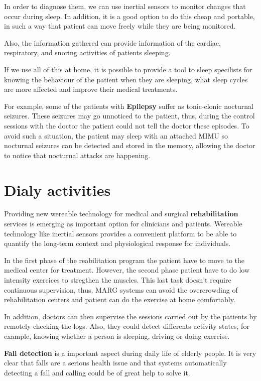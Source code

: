 In order to diagnose them, we can use inertial sensors to monitor changes that occur during sleep. In addition, it is a good option to do this  cheap and portable, in such a way that patient can move freely while they are being monitored\cite{A.Olivares2013}.

Also, the information gathered can provide information  of the cardiac, respiratory, and snoring activities of patients sleeping\cite{SanchezDaniel}.

If we use all of this at home, it is possible to provide a tool to sleep specilists for knowing the behaviour of the patient when they are sleeping, what sleep cycles are more affected and improve their medical  treatments. 

For example,  some of the patients with \textbf{Epilepsy} suffer as tonic-clonic nocturnal seizures. These seizures  may go unnoticed to the patient, thus, during the control sessions with the doctor the patient could not tell the doctor these episodes. To avoid such a situation, the patient may sleep with an attached MIMU so nocturnal seizures can be detected and stored in the memory, allowing the doctor to notice that nocturnal attacks are happening\cite{A.Olivares2013}. 

\section{Dialy activities }
Providing new wereable technology for medical and surgical \textbf{rehabilitation} services is emerging as important option for clinicians and patients. Wereable technology like inertial sensors provides  a convenient platform to be able to quantify the long-term context and physiological response for  individuals\cite{Sung}.

In the first phase of the reabilitation program the patient have to move to the medical center for treatment. However, the second phase patient have to do low intensity exercices to stregthen  the muscles. This last task doesn’t require continuous  supervision, thus, MARG systems can avoid the overcrowding of rehabilitation centers and patient can do the exercise at home comfortably\cite{A.Olivares2013}.

In addition, doctors can then supervise the sessions carried out by the patients by remotely checking the logs. Also, they could detect differents activity states, for example, knowing whether a person  is sleeping, driving or doing exercise\cite{A.Olivares2013}.

\textbf{Fall detection} is a important aspect during daily life of elderly people. It is very clear that falls are a serious health issue and that systems automatically detecting a fall and calling could be of great help to solve it. 

